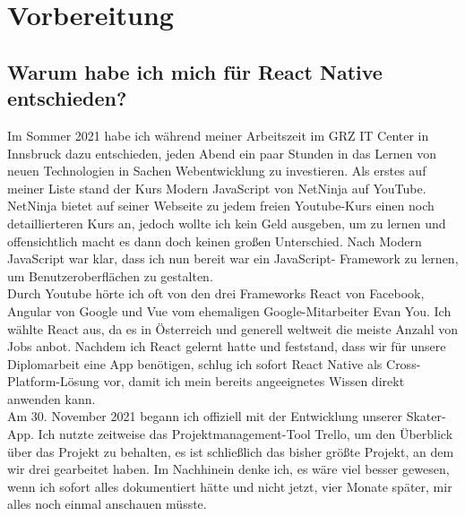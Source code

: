 \chapter{Vorbereitung}

\section{Warum habe ich mich für React Native entschieden?}
Im Sommer 2021 habe ich während meiner Arbeitszeit im GRZ IT Center in Innsbruck dazu entschieden,
jeden Abend ein paar Stunden in das Lernen von neuen Technologien in Sachen Webentwicklung zu
investieren. Als erstes auf meiner Liste stand der Kurs Modern JavaScript von NetNinja auf YouTube.
NetNinja bietet auf seiner Webseite zu jedem freien Youtube-Kurs einen noch detaillierteren Kurs an,
jedoch wollte ich kein Geld ausgeben, um zu lernen und offensichtlich macht es dann doch keinen
großen Unterschied. Nach Modern JavaScript war klar, dass ich nun bereit war ein JavaScript-
Framework zu lernen, um Benutzeroberflächen zu gestalten. \\

Durch Youtube hörte ich oft von den drei Frameworks React von Facebook, Angular von Google und Vue
vom ehemaligen Google-Mitarbeiter Evan You. Ich wählte React aus, da es in Österreich und generell
weltweit die meiste Anzahl von Jobs anbot. Nachdem ich React gelernt hatte und feststand, dass wir
für unsere Diplomarbeit eine App benötigen, schlug ich sofort React Native als Cross-Platform-Lösung
vor, damit ich mein bereits angeeignetes Wissen direkt anwenden kann. \\

Am 30. November 2021 begann ich offiziell mit der Entwicklung unserer Skater-App. Ich nutzte
zeitweise das Projektmanagement-Tool Trello, um den Überblick über das Projekt zu behalten, es ist
schließlich das bisher größte Projekt, an dem wir drei gearbeitet haben. Im Nachhinein denke ich,
es wäre viel besser gewesen, wenn ich sofort alles dokumentiert hätte und nicht jetzt, vier Monate
später, mir alles noch einmal anschauen müsste.